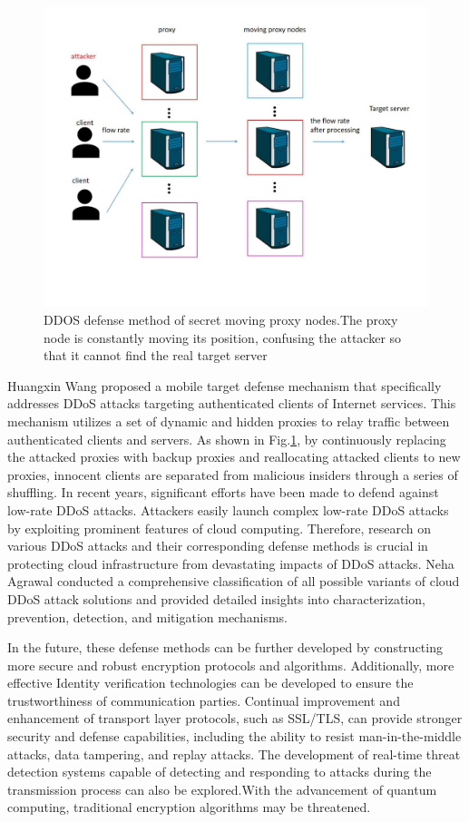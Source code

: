\documentclass[conference]{IEEEtran}
\begin{document}
\begin{figure}[htbp]
    \centerline{\includegraphics[width=0.8\linewidth,height=0.6\linewidth]{picture/de-ddos.jpg}}
    \caption{DDOS defense method of secret moving proxy nodes.The proxy node is constantly moving its position, confusing the attacker so that it cannot find the real target server}
    \label{fig16}
\end{figure}

Huangxin Wang \cite{b131} proposed a mobile target defense mechanism that specifically addresses DDoS
attacks targeting authenticated clients of Internet services.
This mechanism utilizes a set of dynamic and hidden proxies to relay
traffic between authenticated clients and servers. As shown in Fig.\ref{fig16}, by continuously
replacing the attacked proxies with backup proxies and reallocating attacked clients to new proxies,
innocent clients are separated from malicious insiders through a series of shuffling.
In recent years, significant efforts have been made to defend against
low-rate DDoS attacks. Attackers easily launch complex low-rate
DDoS attacks by exploiting prominent features of cloud computing.
Therefore, research on various DDoS attacks and their corresponding defense
methods is crucial in protecting cloud infrastructure from devastating impacts
of DDoS attacks. Neha Agrawal \cite{b132} conducted a comprehensive classification
of all possible variants of cloud DDoS attack solutions and provided detailed insights
into characterization, prevention, detection, and mitigation mechanisms.

In the future, these defense methods can be further developed by constructing more secure and
robust encryption protocols and algorithms. Additionally, more effective Identity verification 
technologies can be developed to ensure the trustworthiness of communication parties. Continual 
improvement and enhancement of transport layer protocols, such as SSL/TLS, can provide stronger 
security and defense capabilities, including the ability to resist man-in-the-middle attacks, 
data tampering, and replay attacks. The development of real-time threat detection systems capable 
of detecting and responding to attacks during the transmission process can also be explored.With 
the advancement of quantum computing, traditional encryption algorithms may be threatened. 
\end{document}
